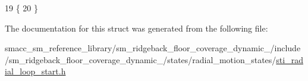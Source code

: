 \begin{DoxyCode}
19   \{
20   \}
\end{DoxyCode}


The documentation for this struct was generated from the following file\+:\begin{DoxyCompactItemize}
\item 
smacc\+\_\+sm\+\_\+reference\+\_\+library/sm\+\_\+ridgeback\+\_\+floor\+\_\+coverage\+\_\+dynamic\+\_/include/sm\+\_\+ridgeback\+\_\+floor\+\_\+coverage\+\_\+dynamic\+\_/states/radial\+\_\+motion\+\_\+states/\hyperlink{sm__ridgeback__floor__coverage__dynamic__1_2include_2sm__ridgeback__floor__coverage__dynamic__1_811fd75c14296f546b6997bebdac1df2}{sti\+\_\+radial\+\_\+loop\+\_\+start.\+h}\end{DoxyCompactItemize}
